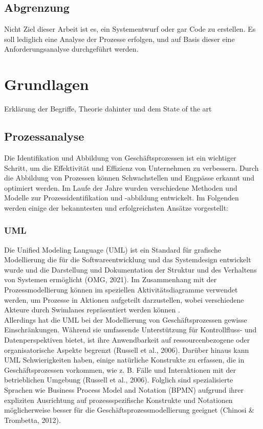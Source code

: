\documentclass[11pt,a4paper]{scrartcl}
\begin{document}
\subsection{Abgrenzung}\label{subsec:abgrenzung}
Nicht Ziel dieser Arbeit ist es, ein Systementwurf oder gar Code zu erstellen.
Es soll lediglich eine Analyse der Prozesse erfolgen, und auf Basis dieser eine Anforderungsanalyse durchgeführt werden.

\section{Grundlagen}\label{sec:grundlagen}
Erklärung der Begriffe, Theorie dahinter und dem State of the art
\subsection{Prozessanalyse}\label{subsec:prozessanalyse-grundlagen}
Die Identifikation und Abbildung von Geschäftsprozessen ist ein wichtiger Schritt, um die Effektivität und Effizienz von Unternehmen zu verbessern.
Durch die Abbildung von Prozessen können Schwachstellen und Engpässe erkannt und optimiert werden.
Im Laufe der Jahre wurden verschiedene Methoden und Modelle zur Prozessidentifikation und -abbildung entwickelt.
Im Folgenden werden einige der bekanntesten und erfolgreichsten Ansätze vorgestellt:

\subsubsection{UML}
Die Unified Modeling Language (UML) ist ein Standard für grafische Modellierung die für die Softwareentwicklung und das Systemdesign entwickelt wurde und die Darstellung und Dokumentation der Struktur und des Verhaltens von Systemen ermöglicht (OMG, 2021).
Im Zusammenhang mit der Prozessmodellierung können im speziellen Aktivitätsdiagramme verwendet werden, um Prozesse in Aktionen aufgeteilt darzustellen, wobei verschiedene Akteure durch Swimlanes repräsentiert werden können \cite{List2006}.\\

Allerdings hat die UML bei der Modellierung von Geschäftsprozessen gewisse Einschränkungen.
Während sie umfassende Unterstützung für Kontrollfluss- und Datenperspektiven bietet, ist ihre Anwendbarkeit auf ressourcenbezogene oder organisatorische Aspekte begrenzt (Russell et al., 2006).
Darüber hinaus kann UML Schwierigkeiten haben, einige natürliche Konstrukte zu erfassen, die in Geschäftsprozessen vorkommen, wie z. B. Fälle und Interaktionen mit der betrieblichen Umgebung (Russell et al., 2006).
Folglich sind spezialisierte Sprachen wie Business Process Model and Notation (BPMN) aufgrund ihrer expliziten Ausrichtung auf prozessspezifische Konstrukte und Notationen möglicherweise besser für die Geschäftsprozessmodellierung geeignet (Chinosi \& Trombetta, 2012).
\end{document}
